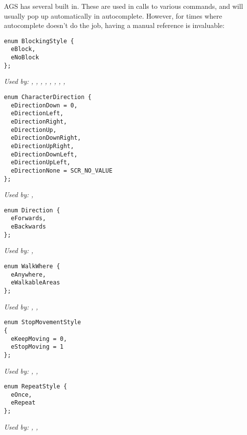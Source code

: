 AGS has several  built in. These are used in calls to
various commands, and will usually pop up automatically in autocomplete. However, for times
where autocomplete doesn't do the job, having a manual reference is invaluable:

\begin{verbatim}
enum BlockingStyle {
  eBlock,
  eNoBlock
};
\end{verbatim}
\it{Used by:} ,
,
,
,
,
,
,
,

\begin{verbatim}
enum CharacterDirection {
  eDirectionDown = 0,
  eDirectionLeft,
  eDirectionRight,
  eDirectionUp,
  eDirectionDownRight,
  eDirectionUpRight,
  eDirectionDownLeft,
  eDirectionUpLeft,
  eDirectionNone = SCR_NO_VALUE
};
\end{verbatim}
\it{Used by:} ,

\begin{verbatim}
enum Direction {
  eForwards,
  eBackwards
};
\end{verbatim}
\it{Used by:} ,

\begin{verbatim}
enum WalkWhere {
  eAnywhere,
  eWalkableAreas
};
\end{verbatim}
\it{Used by:} ,
,

\begin{verbatim}
enum StopMovementStyle
{
  eKeepMoving = 0,
  eStopMoving = 1
};
\end{verbatim}
\it{Used by:} ,
,

\begin{verbatim}
enum RepeatStyle {
  eOnce,
  eRepeat
};
\end{verbatim}
\it{Used by:} ,
,


